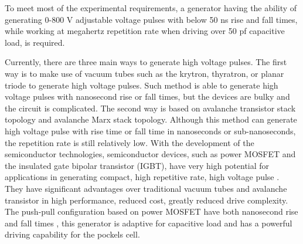 \documentclass[aip,rsi,reprint,graphicx]{revtex4-1} %
\begin{document}
 To meet most of the experimental requirements, a generator having the ability of generating 0-800 V adjustable voltage pulses with below 50 ns rise and fall times, while working at megahertz repetition rate when driving over 50 pf capacitive load, is required.

Currently, there are three main ways to generate high voltage pulses. 
The first way is to make use of vacuum tubes such as the krytron, thyratron, or planar triode to generate high voltage pulses\cite{Rohwein1995improved}. 
Such method is able to generate high voltage pulses with nanosecond rise or fall times, but the devices are bulky and the circuit is complicated. 
The second way is based on avalanche transistor stack topology and avalanche Marx stack topology\cite{Fulkerson1997,Bidin2009,Bishop2006}. 
Although this method can generate high voltage pulse with rise time or fall time in nanoseconds or sub-nanoseconds, the repetition rate is still relatively low. 
With the development of the semiconductor technologies, semiconductor devices, such as power MOSFET and the insulated gate bipolar transistor (IGBT), have very high potential for applications in generating compact, high repetitive rate, high voltage pulse \cite{wang2013semiconductor,Feng2011}. 
They have significant advantages over traditional vacuum tubes and avalanche transistor in high performance, reduced cost, greatly reduced drive complexity. 
The push-pull configuration based on power MOSFET have both nanosecond rise and fall times \cite{bernius1990improved}, this generator is adaptive for capacitive load and has a powerful driving capability for the pockels cell.
\end{document}

